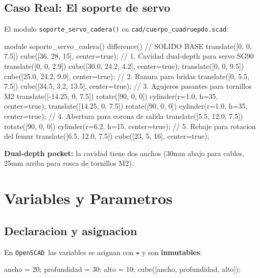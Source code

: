 \documentclass[12pt, oneside, a4paper]{report}
\newcommand{\openscadlogo}{\texttt{OpenSCAD}}
\newcommand{\codigo}[1]{\texttt{#1}}
\begin{document}
\section{Caso Real: El soporte de servo}
El modulo \codigo{soporte\_servo\_cadera()} en \codigo{cad/cuerpo\_cuadruepdo.scad}:

\begin{openscad}
module soporte_servo_cadera() {
    difference() {
        // SOLIDO BASE
        translate([0, 0, 7.5])
            cube([36, 28, 15], center=true);
        // 1. Cavidad dual-depth para servo SG90
        translate([0, 0, 2.9])
            cube([30.0, 24.2, 4.2], center=true);
        translate([0, 0, 9.5])
            cube([25.0, 24.2, 9.0], center=true);
        // 2. Ranura para bridas
        translate([0, 5.5, 7.5])
            cube([34.5, 3.2, 13.5], center=true);
        // 3. Agujeros pasantes para tornillos M2
        translate([-14.25, 0, 7.5])
            rotate([90, 0, 0])
                cylinder(r=1.0, h=35, center=true);
        translate([14.25, 0, 7.5])
            rotate([90, 0, 0])
                cylinder(r=1.0, h=35, center=true);
        // 4. Abertura para corona de salida
        translate([5.5, 12.0, 7.5])
            rotate([90, 0, 0])
                cylinder(r=6.2, h=15, center=true);
        // 5. Rebaje para rotacion del femur
        translate([6.5, 12.0, 7.5])
            cube([23, 5, 16], center=true);
    }
}
\end{openscad}

\textbf{Dual-depth pocket:} la cavidad tiene dos anchos (30mm abajo para cables, 25mm arriba para rosca de tornillos M2).

\chapter{Variables y Parametros}

\section{Declaracion y asignacion}
En \openscadlogo\ las variables se asignan con \codigo{=} y son \textbf{inmutables}:
\begin{openscad}
ancho = 20; profundidad = 30; alto = 10;
cube([ancho, profundidad, alto]);
\end{openscad}
\end{document}
